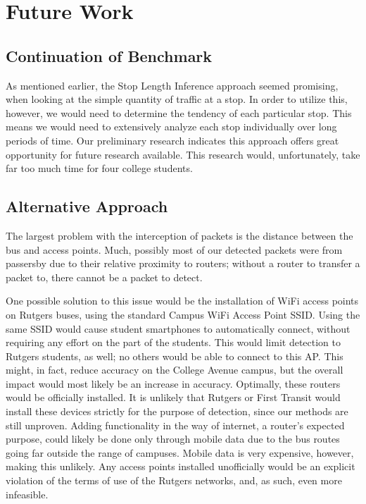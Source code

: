 \section{Future Work}



\subsection*{Continuation of Benchmark}
As mentioned earlier, the Stop Length Inference approach seemed promising, when looking at the simple quantity of traffic at a stop.
In order to utilize this, however, we would need to determine the tendency of each particular stop.
This means we would need to extensively analyze each stop individually over long periods of time.
Our preliminary research indicates this approach offers great opportunity for future research available.
This research would, unfortunately, take far too much time for four college students.

\subsection*{Alternative Approach}
The largest problem with the interception of packets is the distance between the bus and access points.
Much, possibly most of our detected packets were from passersby due to their relative proximity to routers; without a router to transfer a packet to, there cannot be a packet to detect.

One possible solution to this issue would be the installation of WiFi access points on Rutgers buses, using the standard Campus WiFi Access Point SSID.
Using the same SSID would cause student smartphones to automatically connect, without requiring any effort on the part of the students.
This would limit detection to Rutgers students, as well; no others would be able to connect to this AP.
This might, in fact, reduce accuracy on the College Avenue campus, but the overall impact would most likely be an increase in accuracy.
Optimally, these routers would be officially installed.
It is unlikely that Rutgers or First Transit would install these devices strictly for the purpose of detection, since our methods are still unproven.
Adding functionality in the way of internet, a router's expected purpose, could likely be done only through mobile data due to the bus routes going far outside the range of campuses.
Mobile data is very expensive, however, making this unlikely.
Any access points installed unofficially would be an explicit violation of the terms of use of the Rutgers networks, and, as such, even more infeasible.

